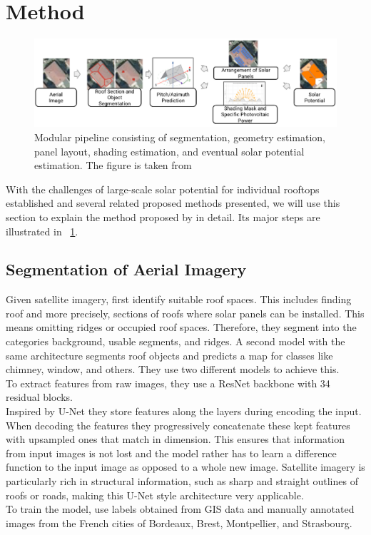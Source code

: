 \documentclass{article} %
\newcommand{\figref}[1]{\figurename~\ref{#1}}
\begin{document}
\section*{Method}
\begin{figure}
	\centering
	\includegraphics[width=\linewidth]{../figures/fig_1.pdf}
	\caption{Modular pipeline consisting of segmentation, geometry estimation, panel layout, shading estimation, and eventual solar potential estimation. The figure is taken from \citet{de2021predicting}}
	\label{fig:arch}
\end{figure}
With the challenges of large-scale solar potential for individual rooftops established and several related proposed methods presented, we will use this section to explain the method proposed by \citet*{de2021predicting} in detail. Its major steps are illustrated in \figref{fig:arch}.\\
\subsection*{Segmentation of Aerial Imagery}
Given satellite imagery, \citet{de2021predicting} first identify suitable roof spaces. This includes finding roof and more precisely, sections of roofs where solar panels can be installed. This means omitting ridges or occupied roof spaces. Therefore, they segment into the categories background, usable segments, and ridges. A second model with the same architecture segments roof objects and predicts a map for classes like chimney, window, and others. They use two different models to achieve this. \cite{de2021predicting}\\
To extract features from raw images, they use a ResNet backbone \cite{he2016deep} with 34 residual blocks.\\
Inspired by U-Net \cite{ronneberger2015u} they store features along the layers during encoding the input. When decoding the features they progressively concatenate these kept features with upsampled ones that match in dimension. This ensures that information from input images is not lost and the model rather has to learn a difference function to the input image as opposed to a whole new image. Satellite imagery is particularly rich in structural information, such as sharp and straight outlines of roofs or roads, making this U-Net style architecture very applicable.\\
To train the model, \citet{de2021predicting} use labels obtained from GIS data and manually annotated images from the French cities of Bordeaux, Brest, Montpellier, and Strasbourg.
\end{document}
